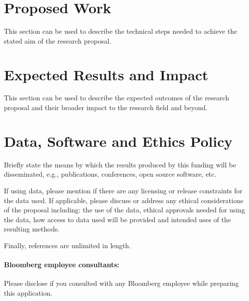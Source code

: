 \documentclass[10pt]{article}
\begin{document}
\section{Proposed Work}

This section can be used to describe the technical steps needed to achieve the stated aim of the research proposal.
	
\section{Expected Results and Impact} 
	
This section can be used to describe the expected outcomes of the research proposal and their broader impact to the research field and beyond.
	
\section{Data, Software and Ethics Policy}

Briefly state the means by which the results produced by this funding will be disseminated, e.g., publications, conferences, open source software, etc.

If using data, please mention if there are any licensing or release constraints for the data used. If applicable, please discuss or address any ethical considerations of the proposal including: the use of the data, ethical approvals needed for using the data, how access to data used will be provided and intended uses of the resulting methods.

Finally, references are unlimited in length.


\paragraph{Bloomberg employee consultants:} Please disclose if you consulted with any Bloomberg employee while preparing this application.

\clearpage



	
\end{document}
